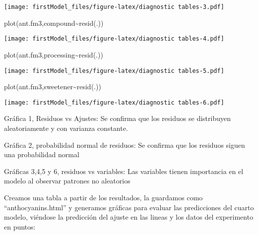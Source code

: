 \documentclass[
]{article}
\newenvironment{Shaded}{\begin{snugshade}}{\end{snugshade}}
\newcommand{\FunctionTok}[1]{\textcolor[rgb]{0.00,0.00,0.00}{#1}}
\newcommand{\NormalTok}[1]{#1}
\newcommand{\SpecialCharTok}[1]{\textcolor[rgb]{0.00,0.00,0.00}{#1}}
\begin{document}
\texttt{[image: firstModel\_files/figure-latex/diagnostic tables-3.pdf]}

\begin{Shaded}
\begin{Highlighting}[]
\FunctionTok{plot}\NormalTok{(ant.fm3,compound}\SpecialCharTok{\textasciitilde{}}\FunctionTok{resid}\NormalTok{(.))}
\end{Highlighting}
\end{Shaded}

\texttt{[image: firstModel\_files/figure-latex/diagnostic tables-4.pdf]}

\begin{Shaded}
\begin{Highlighting}[]
\FunctionTok{plot}\NormalTok{(ant.fm3,processing}\SpecialCharTok{\textasciitilde{}}\FunctionTok{resid}\NormalTok{(.))}
\end{Highlighting}
\end{Shaded}

\texttt{[image: firstModel\_files/figure-latex/diagnostic tables-5.pdf]}

\begin{Shaded}
\begin{Highlighting}[]
\FunctionTok{plot}\NormalTok{(ant.fm3,sweetener}\SpecialCharTok{\textasciitilde{}}\FunctionTok{resid}\NormalTok{(.))}
\end{Highlighting}
\end{Shaded}

\texttt{[image: firstModel\_files/figure-latex/diagnostic tables-6.pdf]}

Gráfica 1, Residuos vs Ajustes: Se confirma que los residuos se
distribuyen aleatoriamente y con varianza constante.

Gráfica 2, probabilidad normal de residuos: Se confirma que los residuos
siguen una probabilidad normal

Gráficas 3,4,5 y 6, residuos vs variables: Las variables tienen
importancia en el modelo al observar patrones no aleatorios

Creamos una tabla a partir de los resultados, la guardamos como
``anthocyanins.html'' y generamos gráficas para evaluar las predicciones
del cuarto modelo, viéndose la predicción del ajuste en las lineas y los
datos del experimento en puntos:
\end{document}
